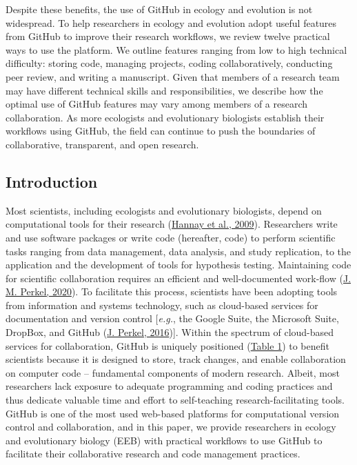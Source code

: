Despite these benefits, the use of GitHub in ecology and evolution is not widespread.
To help researchers in ecology and evolution adopt useful features from GitHub to improve their research workflows, we review twelve practical ways to use the platform.
We outline features ranging from low to high technical difficulty: storing code, managing projects, coding collaboratively, conducting peer review, and writing a manuscript.
Given that members of a research team may have different technical skills and responsibilities, we describe how the optimal use of GitHub features may vary among members of a research collaboration.
As more ecologists and evolutionary biologists establish their workflows using GitHub, the field can continue to push the boundaries of collaborative, transparent, and open research.

\hypertarget{introduction}{%
\subsection{Introduction}\label{introduction}}

Most scientists, including ecologists and evolutionary biologists, depend on computational tools for their research (\protect\hyperlink{ref-fJWFe93e}{Hannay et al., 2009}).
Researchers write and use software packages or write code (hereafter, code) to perform scientific tasks ranging from data management, data analysis, and study replication, to the application and the development of tools for hypothesis testing.
Maintaining code for scientific collaboration requires an efficient and well-documented work-flow (\protect\hyperlink{ref-1Kqna6l2}{J. M. Perkel, 2020}).
To facilitate this process, scientists have been adopting tools from information and systems technology, such as cloud-based services for documentation and version control {[}\emph{e.g.}, the Google Suite, the Microsoft Suite, DropBox, and GitHub (\protect\hyperlink{ref-10ghgV3S8}{J. Perkel, 2016}){]}.
Within the spectrum of cloud-based services for collaboration, GitHub is uniquely positioned (\protect\hyperlink{tbl:compare}{Table 1}) to benefit scientists because it is designed to store, track changes, and enable collaboration on computer code -- fundamental components of modern research.
Albeit, most researchers lack exposure to adequate programming and coding practices and thus dedicate valuable time and effort to self-teaching research-facilitating tools.
GitHub is one of the most used web-based platforms for computational version control and collaboration, and in this paper, we provide researchers in ecology and evolutionary biology (EEB) with practical workflows to use GitHub to facilitate their collaborative research and code management practices.

